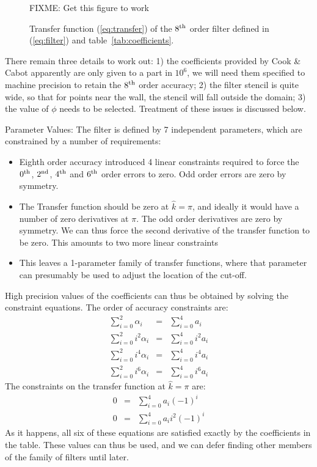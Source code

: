 \begin{figure}[t]
\begin{center}
FIXME: Get this figure to work
\end{center}
 \caption{Transfer function (\ref{eq:transfer}) of the $8^{\rm th}$ order filter defined in
 (\ref{eq:filter}) and table~\ref{tab:coefficients}.}
\label{fig:transfer}
\end{figure}

There remain three details to work out: 1) the coefficients provided by
Cook \& Cabot apparently are only given to a part in $10^6$, we will
need them specified to machine precision to retain the $8^{\rm th}$
order accuracy; 2) the filter stencil is quite wide, so that for points
near the wall, the stencil will fall outside the domain; 3) the value of
$\phi$ needs to be selected. Treatment of
these issues is discussed below.

Parameter Values: The filter is defined by 7 independent
parameters, which are constrained by a number of requirements:
\begin{itemize}
\item Eighth order accuracy introduced 4 linear constraints required to
      force the $0^{\rm th}$, $2^{\rm nd}$, $4^{\rm th}$ and $6^{\rm
      th}$
      order errors to zero. Odd order errors are zero by symmetry.
\item The Transfer function should be zero at $\hat k=\pi$, and ideally
      it would have a number of zero derivatives at $\pi$. The odd order
      derivatives are zero by symmetry. We can thus force the second
      derivative of the transfer function to be zero. This amounts to
      two more linear constraints
\item This leaves a 1-parameter family of transfer functions, where that
      parameter can presumably be used to adjust the location of the
      cut-off.
\end{itemize}
High precision values of the coefficients can thus be obtained by
solving the constraint equations. The order of accuracy constraints are:
\begin{eqnarray}
\sum_{i=0}^2\alpha_i&=&\sum_{i=0}^4a_i\\
\sum_{i=0}^2i^2\alpha_i&=&\sum_{i=0}^4i^2a_i\\
\sum_{i=0}^2i^4\alpha_i&=&\sum_{i=0}^4i^4a_i\\
\sum_{i=0}^2i^6\alpha_i&=&\sum_{i=0}^4i^6a_i
\end{eqnarray}
The constraints on the transfer function at $\hat k=\pi$ are:
\begin{eqnarray}
0&=&\sum_{i=0}^4a_i(-1)^i\\
0&=&\sum_{i=0}^4a_i i^2 (-1)^i
\end{eqnarray}
As it happens, all six of these equations are satisfied exactly by the
coefficients in the table. These values can thus be used, and we can defer finding other
members of the family of filters until later.

